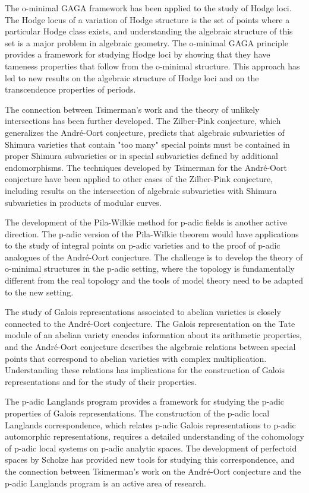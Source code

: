 The o-minimal GAGA framework has been applied to the study of Hodge loci. The Hodge locus of a variation of Hodge structure is the set of points where a particular Hodge class exists, and understanding the algebraic structure of this set is a major problem in algebraic geometry. The o-minimal GAGA principle provides a framework for studying Hodge loci by showing that they have tameness properties that follow from the o-minimal structure. This approach has led to new results on the algebraic structure of Hodge loci and on the transcendence properties of periods.

The connection between Tsimerman's work and the theory of unlikely intersections has been further developed. The Zilber-Pink conjecture, which generalizes the Andr\'{e}-Oort conjecture, predicts that algebraic subvarieties of Shimura varieties that contain "too many" special points must be contained in proper Shimura subvarieties or in special subvarieties defined by additional endomorphisms. The techniques developed by Tsimerman for the Andr\'{e}-Oort conjecture have been applied to other cases of the Zilber-Pink conjecture, including results on the intersection of algebraic subvarieties with Shimura subvarieties in products of modular curves.

The development of the Pila-Wilkie method for p-adic fields is another active direction. The p-adic version of the Pila-Wilkie theorem would have applications to the study of integral points on p-adic varieties and to the proof of p-adic analogues of the Andr\'{e}-Oort conjecture. The challenge is to develop the theory of o-minimal structures in the p-adic setting, where the topology is fundamentally different from the real topology and the tools of model theory need to be adapted to the new setting.

The study of Galois representations associated to abelian varieties is closely connected to the Andr\'{e}-Oort conjecture. The Galois representation on the Tate module of an abelian variety encodes information about its arithmetic properties, and the Andr\'{e}-Oort conjecture describes the algebraic relations between special points that correspond to abelian varieties with complex multiplication. Understanding these relations has implications for the construction of Galois representations and for the study of their properties.

The p-adic Langlands program provides a framework for studying the p-adic properties of Galois representations. The construction of the p-adic local Langlands correspondence, which relates p-adic Galois representations to p-adic automorphic representations, requires a detailed understanding of the cohomology of p-adic local systems on p-adic analytic spaces. The development of perfectoid spaces by Scholze has provided new tools for studying this correspondence, and the connection between Tsimerman's work on the Andr\'{e}-Oort conjecture and the p-adic Langlands program is an active area of research.

